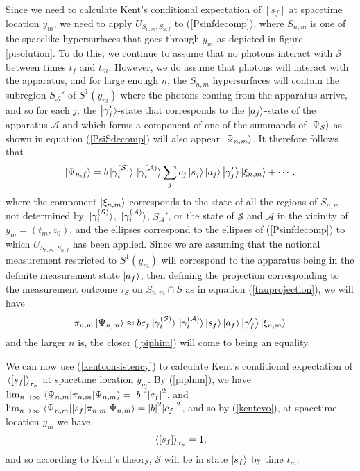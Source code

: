 Since we need to calculate Kent's conditional expectation of $[s_f]$ at spacetime location $y_m$, we need to apply  $U_{S_{n,m},S_{n,f}}$ to (\ref{Psinfdecomp}), where $S_{n,m}$ is one of the spacelike hypersurfaces that goes through $y_m$ as depicted in figure \ref{pisolution}. To do this, we continue to assume that no photons interact with $\mathcal{S}$ between times $t_f$ and $t_m$. However, we do assume that photons will interact with the apparatus, and for large enough $n$, the $S_{n,m}$ hypersurfaces will contain the subregion $S_{\mathcal{A}}'$ of $S^1(y_m)$ where the photons coming from the apparatus arrive, and so for each $j$, the $\ket{\gamma_j'}$-state that corresponds to the $\ket{a_j}$-state of the apparatus $\mathcal{A}$ and which forms a component of one of the summands of $\ket{\Psi_S}$ as shown in equation (\ref{PsiSdecomp}) will also appear $\ket{\Psi_{n,m}}$. It therefore follows that 
\begin{equation}\label{Psinfdecomp}
	\ket{\Psi_{n,f}}=b\ket*{\gamma_i^{(\mathcal{S})}}\ket*{\gamma_i^{(\mathcal{A})}}\sum_j c_j \ket{s_j}\ket{a_j}\ket{\gamma_j'}\ket{\xi_{n,m}}+\cdots.
\end{equation} 
where the component $\ket{\xi_{n,m}}$ corresponds to the state of all the regions of $S_{n,m}$ not determined by $\ket*{\gamma_i^{(\mathcal{S})}}$, $\ket*{\gamma_i^{(\mathcal{A})}}$,  $S_{\mathcal{A}}'$, or the state of $\mathcal{S}$ and $\mathcal{A}$ in the vicinity of $y_m=(t_m, z_0)$, and the ellipses correspond to the ellipses of (\ref{Psinfdecomp}) to which $U_{S_{n,m},S_{n,f}}$ has been applied. Since we are assuming that the notional measurement restricted to $S^1(y_m)$ will correspond to the apparatus being in the definite measurement state $\ket{a_f}$, then defining the projection corresponding to the measurement outcome $\tau_S$ on $S_{n,m}\cap S$ as in equation (\ref{tauprojection}), we will have
\begin{equation}\label{piphim}
\pi_{n,m}\ket{\Psi_{n,m}}\approx b c_f \ket*{\gamma_i^{(\mathcal{S})}}\ket*{\gamma_i^{(\mathcal{A})}}\ket{s_f}\ket{a_f}\ket{\gamma_f'}\ket{\xi_{n,m}}
\end{equation}
and the larger $n$ is, the closer (\ref{piphim}) will come to being an equality. 

We can now use (\ref{kentconsistency}) to calculate Kent's conditional expectation of $\ev*{[s_f]}_{\tau_S}$ at spacetime location $y_m$. By (\ref{piphim}), we have  $\lim_{n\rightarrow\infty}\ev*{\pi_{n,m}}{\Psi_{n,m}}=\abs{b}^2 \abs{c_f}^2 $, and $\lim_{n\rightarrow\infty}\ev*{[s_f] \pi_{n,m}}{\Psi_{n,m}}=\abs{b}^2 \abs{c_f}^2 $, and so by (\ref{kentevo}), at spacetime location $y_m$ we have
$$ \ev*{[s_f]}_{\tau_S}=1,$$
and so according to Kent's theory, $\mathcal{S}$ will be in state $\ket{s_f}$ by time $t_m$.

